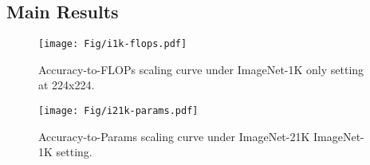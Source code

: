 \documentclass{article}
\begin{document}
\subsection{Main Results}
\begin{figure}[!h]
\centering
\begin{minipage}{.48\textwidth}
    \centering
    \texttt{[image: Fig/i1k-flops.pdf]}
    \caption{Accuracy-to-FLOPs scaling curve under ImageNet-1K only setting at 224x224.}
    \label{fig:1k_flops}
\end{minipage}\hfill
\begin{minipage}{.48\textwidth}
    \centering
    \texttt{[image: Fig/i21k-params.pdf]}
    \caption{Accuracy-to-Params scaling curve under ImageNet-21K  ImageNet-1K setting.}
    \label{fig:21k_params}
\end{minipage}
\vspace{-1em}
\end{figure}
\end{document}
